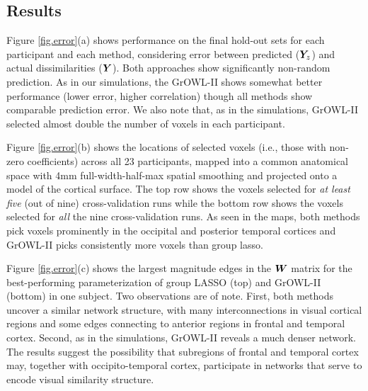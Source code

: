 \subsection{Results}

Figure \ref{fig.error}(a) shows performance on the final hold-out sets for each
participant and each method, considering error between predicted ($\boldsymbol{Y}_z$) and actual
dissimilarities ($\boldsymbol{Y}$). Both approaches show significantly non-random prediction. As in
our simulations, the GrOWL-II shows somewhat better performance (lower error, higher
correlation) though all methods show comparable prediction error. We also note that, as in
the simulations, GrOWL-II selected almost double the number of voxels in each participant.

Figure \ref{fig.error}(b) shows the locations of selected voxels (i.e., those with
non-zero coefficients) across all 23 participants, mapped into a common anatomical space
with 4mm full-width-half-max spatial smoothing and projected onto a model of the cortical
surface. The top row shows the voxels selected for \textit{at least five} (out of nine)
cross-validation runs while the bottom row shows the voxels selected for \textit{all} the
nine cross-validation runs. As seen in the maps, both methods pick voxels prominently in
the occipital and posterior temporal cortices and GrOWL-II picks consistently more voxels
than group lasso.

Figure \ref{fig.error}(c) shows the largest magnitude edges in the $\boldsymbol{W}$ matrix for the
best-performing parameterization of group LASSO (top) and GrOWL-II (bottom) in one
subject. Two observations are of note. First, both methods uncover a similar network
structure, with many interconnections in visual cortical regions and some edges connecting
to anterior regions in frontal and temporal cortex. Second, as in the simulations,
GrOWL-II reveals a much denser network. The results suggest the possibility that
subregions of frontal and temporal cortex may, together with occipito-temporal cortex,
participate in networks that serve to encode visual similarity structure.

